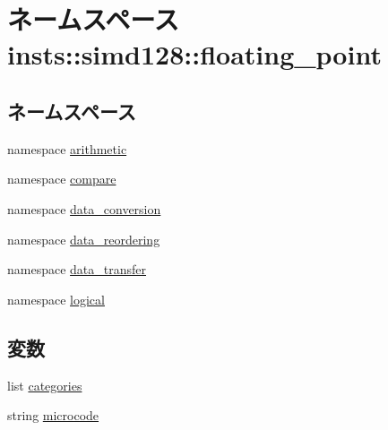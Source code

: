 \hypertarget{namespaceinsts_1_1simd128_1_1floating__point}{
\section{ネームスペース insts::simd128::floating\_\-point}
\label{namespaceinsts_1_1simd128_1_1floating__point}
}
\subsection*{ネームスペース}
\begin{DoxyCompactItemize}
\item 
namespace \hyperlink{namespaceinsts_1_1simd128_1_1floating__point_1_1arithmetic}{arithmetic}
\item 
namespace \hyperlink{namespaceinsts_1_1simd128_1_1floating__point_1_1compare}{compare}
\item 
namespace \hyperlink{namespaceinsts_1_1simd128_1_1floating__point_1_1data__conversion}{data\_\-conversion}
\item 
namespace \hyperlink{namespaceinsts_1_1simd128_1_1floating__point_1_1data__reordering}{data\_\-reordering}
\item 
namespace \hyperlink{namespaceinsts_1_1simd128_1_1floating__point_1_1data__transfer}{data\_\-transfer}
\item 
namespace \hyperlink{namespaceinsts_1_1simd128_1_1floating__point_1_1logical}{logical}
\end{DoxyCompactItemize}
\subsection*{変数}
\begin{DoxyCompactItemize}
\item 
list \hyperlink{namespaceinsts_1_1simd128_1_1floating__point_a273cf0f1630af14c1582f05e53354a55}{categories}
\item 
string \hyperlink{namespaceinsts_1_1simd128_1_1floating__point_a770f11a173e99389a8802f0107ed8f52}{microcode}
\end{DoxyCompactItemize}


